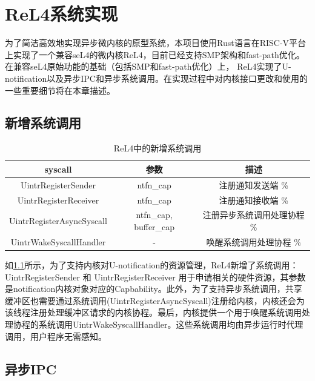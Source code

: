 \chapter{ReL4系统实现}
\label{chap:ReL4_impl}

为了简洁高效地实现异步微内核的原型系统，本项目使用Rust语言在RISC-V平台上实现了一个兼容seL4的微内核ReL4，目前已经支持SMP架构和fast-path优化。在兼容seL4原始功能的基础（包括SMP和fast-path优化）上， ReL4实现了U-notification以及异步IPC和异步系统调用。在实现过程中对内核接口更改和使用的一些重要细节将在本章描述。

\section{新增系统调用}

\begin{table}
    \centering
    \begin{tabular}{|c|c|c|}
        \hline 
        syscall & 参数 & 描述 \\
        \hline
        UintrRegisterSender & ntfn\_cap & 注册通知发送端 \% \\
        \hline
        UintrRegisterReceiver & ntfn\_cap & 注册通知接收端 \% \\
        \hline
        UintrRegisterAsyncSyscall & ntfn\_cap, buffer\_cap & 注册异步系统调用处理协程 \% \\
        \hline
        UintrWakeSyscallHandler & - & 唤醒系统调用处理协程 \% \\
        \hline
    \end{tabular}
    \caption{ReL4中的新增系统调用}
    \label{tab:new_syscall}
\end{table}

如\ref{tab:new_syscall}所示，为了支持内核对U-notification的资源管理，ReL4新增了系统调用：UintrRegisterSender 和 UintrRegisterReceiver 用于申请相关的硬件资源，其参数是notification内核对象对应的Capbability。此外，为了支持异步系统调用，共享缓冲区也需要通过系统调用(UintrRegisterAsyncSyscall)注册给内核，内核还会为该线程注册处理缓冲区请求的内核协程。最后，内核提供一个用于唤醒系统调用处理协程的系统调用UintrWakeSyscallHandler。这些系统调用均由异步运行时代理调用，用户程序无需感知。

\section{异步IPC}

